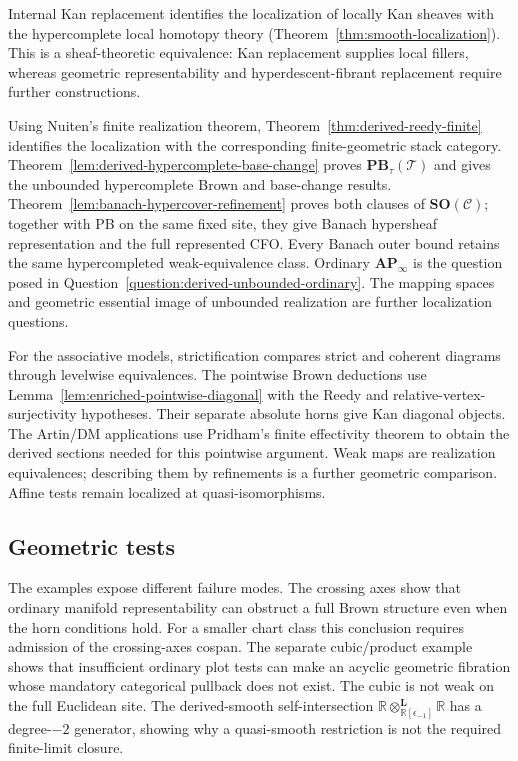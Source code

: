 \documentclass[12pt]{amsart}
\theoremstyle{definition}
\theoremstyle{remark}
\numberwithin{equation}{section}
\newcommand{\R}{\mathbb R}
\begin{document}
Internal Kan replacement identifies the localization of
locally Kan sheaves with the hypercomplete local homotopy
theory (Theorem~\ref{thm:smooth-localization}).
This is a sheaf-theoretic equivalence: Kan replacement
supplies local fillers, whereas geometric representability
and hyperdescent-fibrant replacement require further
constructions.

Using Nuiten's finite realization theorem,
Theorem~\ref{thm:derived-reedy-finite} identifies the
localization with the corresponding finite-geometric stack
category. Theorem~\ref{lem:derived-hypercomplete-base-change}
proves $\mathbf{PB}_\tau(\mathcal T)$ and gives the
unbounded hypercomplete Brown and base-change results.
Theorem~\ref{lem:banach-hypercover-refinement} proves
both clauses of $\mathbf{SO}(\mathcal C)$; together
with PB on the same fixed site, they give Banach
hypersheaf representation and the full represented CFO.
Every Banach outer bound retains the same hypercompleted
weak-equivalence class. Ordinary $\mathbf{AP}_\infty$
is the question posed in
Question~\ref{question:derived-unbounded-ordinary}.
The mapping spaces and geometric essential image of
unbounded realization are further localization questions.

For the associative models, strictification compares strict
and coherent diagrams through levelwise equivalences.
The pointwise Brown deductions use
Lemma~\ref{lem:enriched-pointwise-diagonal} with the
Reedy and relative-vertex-surjectivity hypotheses.
Their separate absolute horns give Kan diagonal
objects. The Artin/DM applications use Pridham's
finite effectivity theorem to obtain the derived
sections needed for this pointwise argument.
Weak maps are realization equivalences; describing
them by refinements is a further geometric comparison.
Affine tests remain localized at quasi-isomorphisms.

\subsection{Geometric tests}

The examples expose different failure modes.
The crossing axes show that ordinary manifold
representability can obstruct a full Brown
structure even when the horn conditions hold.
For a smaller chart class this conclusion requires
admission of the crossing-axes cospan.
The separate cubic/product example shows that insufficient
ordinary plot tests can make an acyclic geometric fibration
whose mandatory categorical pullback does not exist.
The cubic is not weak on the full Euclidean site.
The derived-smooth self-intersection
$\R\otimes_{\R[\epsilon_{-1}]}^{\mathbf L}\R$
has a degree-$-2$ generator, showing why a
quasi-smooth restriction is not the required
finite-limit closure.
\end{document}
